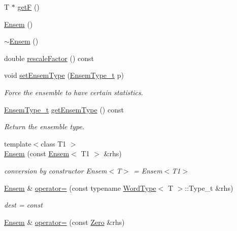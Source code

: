 \begin{DoxyCompactItemize}
T $\ast$ \mbox{\hyperlink{classENSEM_1_1Ensem_ab2909a7d9b171d7e2ba7365c5e962aa6}{getF}} ()
\item 
\mbox{\hyperlink{classENSEM_1_1Ensem_a8875b85c5536f02d10db536a815984b6}{Ensem}} ()
\item 
\mbox{\hyperlink{classENSEM_1_1Ensem_a01e4e19b101048ad2ffcf886017592c9}{$\sim$\+Ensem}} ()
\item 
double \mbox{\hyperlink{classENSEM_1_1Ensem_aecf90199daafa73454e9c1aceef313a4}{rescale\+Factor}} () const
\item 
void \mbox{\hyperlink{classENSEM_1_1Ensem_a5fdfac362fd4347e4383b4e0a8537aec}{set\+Ensem\+Type}} (\mbox{\hyperlink{namespaceENSEM_a2dc2c4a26884f343471e52f23479ddbe}{Ensem\+Type\+\_\+t}} p)
\begin{DoxyCompactList}\small\item\em Force the ensemble to have certain statistics. \end{DoxyCompactList}\item 
\mbox{\hyperlink{namespaceENSEM_a2dc2c4a26884f343471e52f23479ddbe}{Ensem\+Type\+\_\+t}} \mbox{\hyperlink{classENSEM_1_1Ensem_aa2cfc665852c06f9b058a1a2233d249e}{get\+Ensem\+Type}} () const
\begin{DoxyCompactList}\small\item\em Return the ensemble type. \end{DoxyCompactList}\item 
{\footnotesize template$<$class T1 $>$ }\\\mbox{\hyperlink{classENSEM_1_1Ensem_ab0e04ebf09af997fb7f1477cdc48145b}{Ensem}} (const \mbox{\hyperlink{classENSEM_1_1Ensem}{Ensem}}$<$ T1 $>$ \&rhs)
\begin{DoxyCompactList}\small\item\em conversion by constructor Ensem$<$\+T$>$ = Ensem$<$\+T1$>$ \end{DoxyCompactList}\item 
\mbox{\hyperlink{classENSEM_1_1Ensem}{Ensem}} \& \mbox{\hyperlink{classENSEM_1_1Ensem_a1331b77ba6b10ddefa983e39976b4db6}{operator=}} (const typename \mbox{\hyperlink{structENSEM_1_1WordType}{Word\+Type}}$<$ T $>$\+::Type\+\_\+t \&rhs)
\begin{DoxyCompactList}\small\item\em dest = const \end{DoxyCompactList}\item 
\mbox{\hyperlink{classENSEM_1_1Ensem}{Ensem}} \& \mbox{\hyperlink{classENSEM_1_1Ensem_a55913bc59bca1022f5189cbc86632c11}{operator=}} (const \mbox{\hyperlink{structENSEM_1_1Zero}{Zero}} \&rhs)

\end{DoxyCompactItemize}

